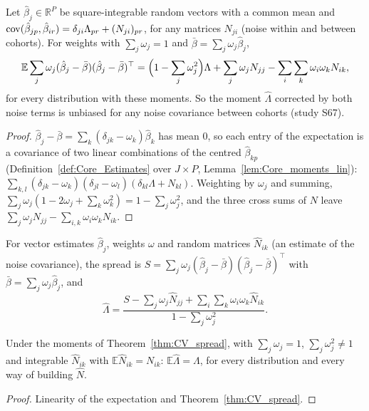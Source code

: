 \begin{theorem}\label{thm:CV_spread}
  \leanok
  Let $\hat\beta_j \in \mathbb R^P$ be square-integrable random vectors with a common mean and
  $\operatorname{cov}(\hat\beta_{jp}, \hat\beta_{ir}) = \delta_{ji}\Lambda_{pr} + (N_{ji})_{pr}$, for any
  matrices $N_{ji}$ (noise within and between cohorts). For weights with $\sum_j \omega_j = 1$
  and $\bar\beta = \sum_j \omega_j\hat\beta_j$,
  \[
    \mathbb E\sum_j \omega_j(\hat\beta_j - \bar\beta)(\hat\beta_j - \bar\beta)^\top
      = \Bigl(1 - \sum_j \omega_j^2\Bigr)\Lambda + \sum_j \omega_j N_{jj}
        - \sum_i\sum_k \omega_i\omega_k N_{ik},
  \]
  for every distribution with these moments. So the moment $\hat\Lambda$ corrected by both
  noise terms is unbiased for any noise covariance between cohorts (study S67).
\end{theorem}
\begin{proof}
  \leanok
  $\hat\beta_j - \bar\beta = \sum_k (\delta_{jk} - \omega_k)\hat\beta_k$ has mean $0$, so each
  entry of the expectation is a covariance of two linear combinations of the centred
  $\hat\beta_{kp}$ (Definition~\ref{def:Core_Estimates} over $J \times P$,
  Lemma~\ref{lem:Core_moments_lin}):
  $\sum_{k,l} (\delta_{jk} - \omega_k)(\delta_{jl} - \omega_l)(\delta_{kl}\Lambda + N_{kl})$.
  Weighting by $\omega_j$ and summing, $\sum_j \omega_j(1 - 2\omega_j + \sum_k\omega_k^2)
  = 1 - \sum_j\omega_j^2$, and the three cross sums of $N$ leave
  $\sum_j\omega_jN_{jj} - \sum_{i,k}\omega_i\omega_kN_{ik}$.
\end{proof}

\begin{definition}\label{def:CV_correctedLambda}
  \leanok
  For vector estimates $\hat\beta_j$, weights $\omega$ and random matrices $\hat N_{ik}$
  (an estimate of the noise covariance), the spread is
  $S = \sum_j \omega_j(\hat\beta_j - \bar\beta)(\hat\beta_j - \bar\beta)^\top$ with
  $\bar\beta = \sum_j\omega_j\hat\beta_j$, and
  \[
    \hat\Lambda = \frac{S - \sum_j \omega_j\hat N_{jj} + \sum_i\sum_k \omega_i\omega_k\hat N_{ik}}
                       {1 - \sum_j \omega_j^2}.
  \]
\end{definition}

\begin{theorem}\label{thm:CV_correctedLambda}
  \leanok
  Under the moments of Theorem~\ref{thm:CV_spread}, with $\sum_j\omega_j = 1$,
  $\sum_j\omega_j^2 \ne 1$ and integrable $\hat N_{ik}$ with $\mathbb E\hat N_{ik} = N_{ik}$:
  $\mathbb E\hat\Lambda = \Lambda$, for every distribution and every way of building $\hat N$.
\end{theorem}
\begin{proof}
  \leanok
  Linearity of the expectation and Theorem~\ref{thm:CV_spread}.
\end{proof}

